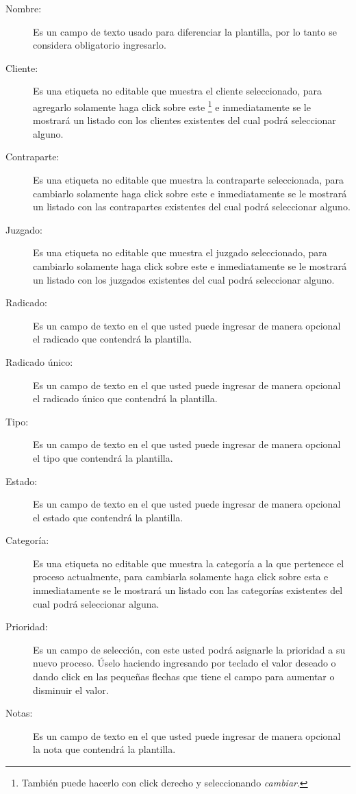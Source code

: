 \begin{description}
\item[Nombre:]Es un campo de texto usado para diferenciar la plantilla, por lo
tanto se considera obligatorio ingresarlo.
\item[Cliente:]Es una etiqueta no editable que muestra el cliente
seleccionado, para agregarlo solamente haga click sobre este
\footnote{Tambi\'en puede hacerlo con click derecho y seleccionando \emph{cambiar}.}
e inmediatamente se
le mostrar\'a un listado con los clientes existentes del cual podr\'a
seleccionar alguno.
\item[Contraparte:]Es una etiqueta no editable que muestra la contraparte
seleccionada, para cambiarlo solamente haga click sobre este
\footnotemark[\value{footnote}]
e inmediatamente
se le mostrar\'a un listado con las contrapartes existentes del cual podr\'a
seleccionar alguno.
\item[Juzgado:]Es una etiqueta no editable que muestra el juzgado
seleccionado, para cambiarlo solamente haga click sobre este
\footnotemark[\value{footnote}]
e inmediatamente
se le mostrar\'a un listado con los juzgados existentes del cual podr\'a
seleccionar alguno.
\item[Radicado:]Es un campo de texto en el que usted puede ingresar de manera
opcional el radicado que contendr\'a la plantilla.
\item[Radicado \'unico:]Es un campo de texto en el que usted puede ingresar de
manera opcional el radicado \'unico que contendr\'a la plantilla.
\item[Tipo:]Es un campo de texto en el que usted puede ingresar de manera
opcional el tipo que contendr\'a la plantilla.
\item[Estado:]Es un campo de texto en el que usted puede ingresar de manera
opcional el estado que contendr\'a la plantilla.
\item[Categor\'ia:]Es una etiqueta no editable que muestra la categor\'ia
a la que pertenece el proceso actualmente, para cambiarla solamente haga click
sobre esta
\footnotemark[\value{footnote}]
e inmediatamente
se le mostrar\'a un listado con las categor\'ias existentes del cual podr\'a
seleccionar alguna.
\item[Prioridad:]Es un campo de selecci\'on, con este usted podr\'a asignarle
la prioridad a su nuevo proceso. \'Uselo haciendo ingresando por teclado el valor deseado o dando click en las peque\~nas flechas que tiene el campo para aumentar o disminuir el valor.
\item[Notas:]Es un campo de texto en el que usted puede ingresar de manera
opcional la nota que contendr\'a la plantilla.
\end{description}

